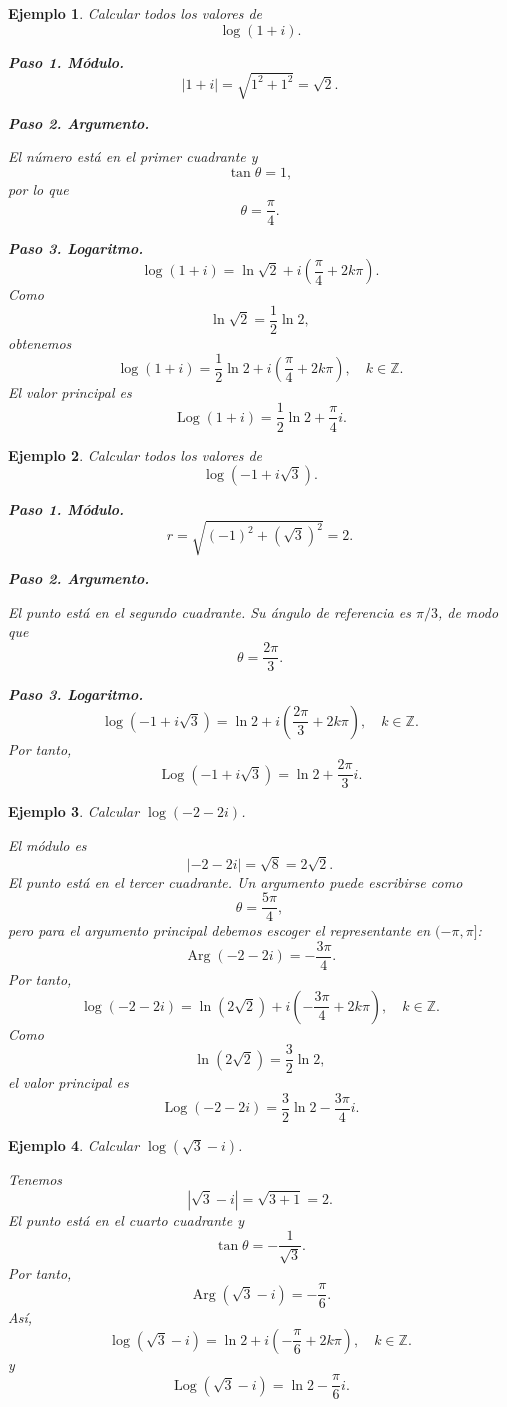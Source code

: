 \documentclass[12pt]{article}
\newtheorem{ejemplo}{Ejemplo}[section]
\begin{document}
\begin{ejemplo}
Calcular todos los valores de
\[
\log(1+i).
\]

\textbf{Paso 1. Módulo.}
\[
|1+i|=\sqrt{1^2+1^2}=\sqrt2.
\]

\textbf{Paso 2. Argumento.}

El número está en el primer cuadrante y
\[
\tan\theta=1,
\]
por lo que
\[
\theta=\frac{\pi}{4}.
\]

\textbf{Paso 3. Logaritmo.}
\[
\log(1+i)
=
\ln\sqrt2
+i\left(\frac{\pi}{4}+2k\pi\right).
\]
Como
\[
\ln\sqrt2=\frac12\ln2,
\]
obtenemos
\[
\boxed{
\log(1+i)
=
\frac12\ln2
+i\left(\frac{\pi}{4}+2k\pi\right),
\quad k\in\mathbb Z.
}
\]
El valor principal es
\[
\boxed{
\operatorname{Log}(1+i)
=
\frac12\ln2+\frac{\pi}{4}i.
}
\]
\end{ejemplo}

\begin{ejemplo}
Calcular todos los valores de
\[
\log(-1+i\sqrt3).
\]

\textbf{Paso 1. Módulo.}
\[
r=\sqrt{(-1)^2+(\sqrt3)^2}=2.
\]

\textbf{Paso 2. Argumento.}

El punto está en el segundo cuadrante. Su ángulo de referencia es $\pi/3$,
de modo que
\[
\theta=\frac{2\pi}{3}.
\]

\textbf{Paso 3. Logaritmo.}
\[
\boxed{
\log(-1+i\sqrt3)
=
\ln2+i\left(\frac{2\pi}{3}+2k\pi\right),
\quad k\in\mathbb Z.
}
\]
Por tanto,
\[
\boxed{
\operatorname{Log}(-1+i\sqrt3)
=
\ln2+\frac{2\pi}{3}i.
}
\]
\end{ejemplo}

\begin{ejemplo}
Calcular $\log(-2-2i)$.

El módulo es
\[
|-2-2i|=\sqrt8=2\sqrt2.
\]
El punto está en el tercer cuadrante. Un argumento puede escribirse como
\[
\theta=\frac{5\pi}{4},
\]
pero para el argumento principal debemos escoger el representante en
$(-\pi,\pi]$:
\[
\operatorname{Arg}(-2-2i)=-\frac{3\pi}{4}.
\]
Por tanto,
\[
\boxed{
\log(-2-2i)
=
\ln(2\sqrt2)
+i\left(-\frac{3\pi}{4}+2k\pi\right),
\quad k\in\mathbb Z.
}
\]
Como
\[
\ln(2\sqrt2)=\frac32\ln2,
\]
el valor principal es
\[
\boxed{
\operatorname{Log}(-2-2i)
=
\frac32\ln2-\frac{3\pi}{4}i.
}
\]
\end{ejemplo}

\begin{ejemplo}
Calcular $\log(\sqrt3-i)$.

Tenemos
\[
|\sqrt3-i|=\sqrt{3+1}=2.
\]
El punto está en el cuarto cuadrante y
\[
\tan\theta=-\frac{1}{\sqrt3}.
\]
Por tanto,
\[
\operatorname{Arg}(\sqrt3-i)=-\frac{\pi}{6}.
\]
Así,
\[
\boxed{
\log(\sqrt3-i)
=
\ln2+i\left(-\frac{\pi}{6}+2k\pi\right),
\quad k\in\mathbb Z.
}
\]
y
\[
\boxed{
\operatorname{Log}(\sqrt3-i)=\ln2-\frac{\pi}{6}i.
}
\]
\end{ejemplo}
\end{document}

